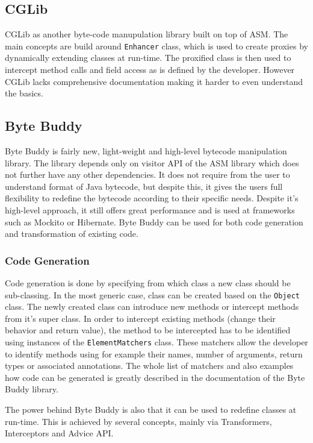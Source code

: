 \subsection{CGLib}
\label{cglib}
CGLib as another byte-code manupulation library built on top of ASM. The main concepts are build around \texttt{Enhancer} class, which is used to create proxies by dynamically extending classes at run-time. The proxified class is then used to intercept method calls and field access as is defined by the developer. However CGLib lacks comprehensive documentation making it harder to even understand the basics.

\subsection{Byte Buddy}
\label{sec:byte_buddy}
Byte Buddy is fairly new, light-weight and high-level bytecode manipulation library. The library depends only on visitor API of the ASM library which does not further have any other dependencies. It does not require from the user to understand format of Java bytecode, but despite this, it gives the users full flexibility to redefine the bytecode according to their specific needs. Despite it's high-level approach, it still offers great performance and is used at frameworks such as Mockito or Hibernate. Byte Buddy can be used for both code generation and transformation of existing code.

\subsubsection{Code Generation}
Code generation is done by specifying from which class a new class should be sub-classing. In the most generic case, class can be created based on the \texttt{Object} class. The newly created class can introduce new methods or intercept methods from it's super class. In order to intercept existing methods (change their behavior and return value), the method to be intercepted has to be identified using instances of the \texttt{ElementMatchers} class. These matchers allow the developer to identify methods using for example their names, number of arguments, return types or associated annotations. The whole list of matchers and also examples how code can be generated is greatly described in the documentation of the Byte Buddy library.

The power behind Byte Buddy is also that it can be used to redefine classes at run-time. This is achieved by several concepts, mainly via Transformers, Interceptors and Advice API.

